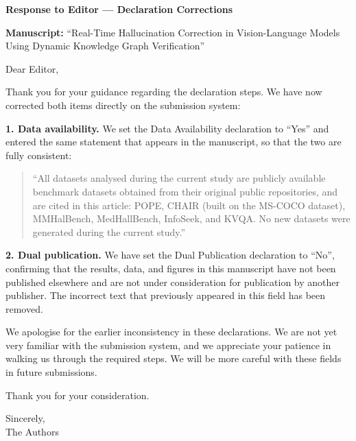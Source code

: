 \documentclass[11pt]{article}
\begin{document}
\begin{center}
{\large\bfseries Response to Editor --- Declaration Corrections}
\end{center}

\vspace{0.5em}
\noindent\textbf{Manuscript:} ``Real-Time Hallucination Correction in Vision-Language
Models Using Dynamic Knowledge Graph Verification''

\vspace{1em}
\noindent Dear Editor,

Thank you for your guidance regarding the declaration steps. We have now corrected
both items directly on the submission system:

\vspace{0.5em}
\noindent\textbf{1. Data availability.}
We set the Data Availability declaration to ``Yes'' and entered the same statement
that appears in the manuscript, so that the two are fully consistent:

\begin{quote}
``All datasets analysed during the current study are publicly available benchmark
datasets obtained from their original public repositories, and are cited in this
article: POPE, CHAIR (built on the MS-COCO dataset), MMHalBench, MedHallBench,
InfoSeek, and KVQA. No new datasets were generated during the current study.''
\end{quote}

\noindent\textbf{2. Dual publication.}
We have set the Dual Publication declaration to ``No'', confirming that the
results, data, and figures in this manuscript have not been published elsewhere
and are not under consideration for publication by another publisher. The
incorrect text that previously appeared in this field has been removed.

\vspace{1em}
\noindent We apologise for the earlier inconsistency in these declarations. We are
not yet very familiar with the submission system, and we appreciate your patience
in walking us through the required steps. We will be more careful with these
fields in future submissions.

\vspace{1em}
\noindent Thank you for your consideration.

\vspace{1.5em}
\noindent Sincerely,\\
The Authors
\end{document}
